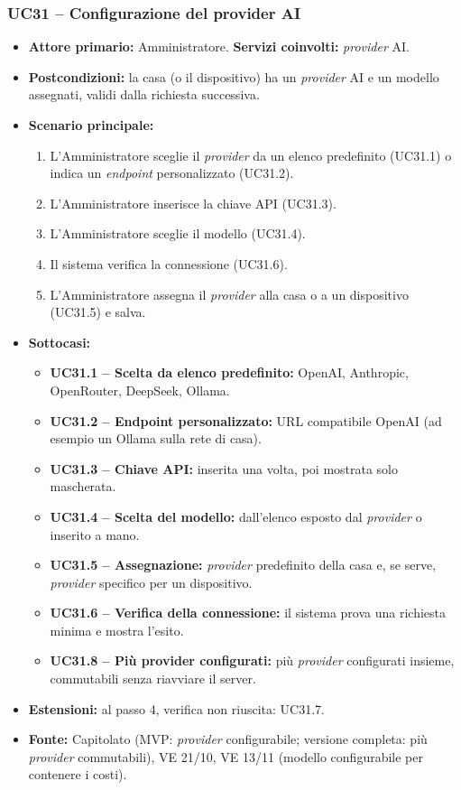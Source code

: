 \documentclass[12pt,a4paper]{article}
\newcommand{\tightlist}{\setlength{\itemsep}{1pt}\setlength{\parskip}{0pt}}
\begin{document}
\subsubsection{UC31 -- Configurazione del provider AI}
\begin{itemize}
\tightlist
\item \textbf{Attore primario:} Amministratore. \textbf{Servizi coinvolti:} \emph{provider} AI.
\item \textbf{Postcondizioni:} la casa (o il dispositivo) ha un \emph{provider} AI e un modello assegnati, validi dalla richiesta successiva.
\item \textbf{Scenario principale:}
\begin{enumerate}
\tightlist
\item L'Amministratore sceglie il \emph{provider} da un elenco predefinito (UC31.1) o indica un \emph{endpoint} personalizzato (UC31.2).
\item L'Amministratore inserisce la chiave API (UC31.3).
\item L'Amministratore sceglie il modello (UC31.4).
\item Il sistema verifica la connessione (UC31.6).
\item L'Amministratore assegna il \emph{provider} alla casa o a un dispositivo (UC31.5) e salva.
\end{enumerate}
\item \textbf{Sottocasi:}
\begin{itemize}
\tightlist
\item \textbf{UC31.1 -- Scelta da elenco predefinito:} OpenAI, Anthropic, OpenRouter, DeepSeek, Ollama.
\item \textbf{UC31.2 -- Endpoint personalizzato:} URL compatibile OpenAI (ad esempio un Ollama sulla rete di casa).
\item \textbf{UC31.3 -- Chiave API:} inserita una volta, poi mostrata solo mascherata.
\item \textbf{UC31.4 -- Scelta del modello:} dall'elenco esposto dal \emph{provider} o inserito a mano.
\item \textbf{UC31.5 -- Assegnazione:} \emph{provider} predefinito della casa e, se serve, \emph{provider} specifico per un dispositivo.
\item \textbf{UC31.6 -- Verifica della connessione:} il sistema prova una richiesta minima e mostra l'esito.
\item \textbf{UC31.8 -- Più provider configurati:} più \emph{provider} configurati insieme, commutabili senza riavviare il server.
\end{itemize}
\item \textbf{Estensioni:} al passo 4, verifica non riuscita: UC31.7.
\item \textbf{Fonte:} Capitolato (MVP: \emph{provider} configurabile; versione completa: più \emph{provider} commutabili), VE 21/10, VE 13/11 (modello configurabile per contenere i costi).
\end{itemize}
\end{document}
